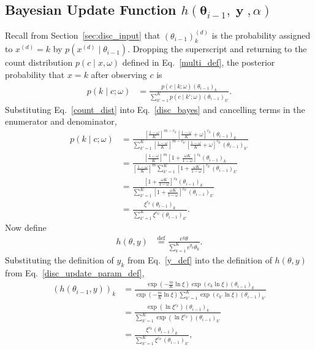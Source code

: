 \documentclass[11pt,table]{article}
\DeclareMathOperator{\y}{\mathbf{y}}
\newcommand*{\defeq}{\stackrel{\text{def}}{=}}
\newcommand{\tidx}[2]{#1_{#2}}
\renewcommand{\vec}[1]{\boldsymbol{#1}}
\newcommand{\pars}{\theta}
\newcommand{\parsn}{\vec{\pars}}
\newcommand{\parsnt}[1]{\tidx{\parsn}{#1}}
\newcommand{\0}[1]{\constvec{0}{#1}}
\newcommand{\1}[1]{\constvec{1}{#1}}
\begin{document}
\subsection{Bayesian Update Function \texorpdfstring{$h(\parsnt{i-1}, \y, \alpha)$}{}}
Recall from Section~\ref{sec:disc_input} that $(\theta_{i-1})^{(d)}_k$ is the probability assigned to $x^{(d)}=k$ by $p(x^{(d)} \mid \theta_{i-1})$.
Dropping the superscript and returning to the count distribution $p(c \mid x, \omega)$ defined in Eq.~\ref{multi_def}, the posterior probability that $x=k$ after observing $c$ is
\begin{align}
p(k \mid c; \omega) &= \frac{p (c \mid k; \omega) (\theta_{i-1})_k}{\sum_{k'=1}^K p(c \mid k';\omega)(\theta_{i-1})_{k'}}.\label{disc_bayes}
\end{align}
Substituting Eq.~\ref{count_dist} into Eq.~\ref{disc_bayes} and cancelling terms in the enumerator and denominator,
\begin{align}
p(k\mid c;\omega) &= \frac{\left[\frac{1-\omega}{K}\right]^{m-c_k}\left[\frac{1-\omega}{K} + \omega\right]^{c_k} (\theta_{i-1})_k}{ \sum_{k'=1}^K{\left[\frac{1-\omega}{K}\right]^{m-c_{k'}}\left[\frac{1-\omega}{K} +\omega \right]^{c_{k'}}(\theta_{i-1})_{k'}}}\\
&=  \frac{\left[\frac{1-\omega}{K}\right]^{m}\left[1 + \frac{\omega K}{1-\omega}\right]^{c_k}(\theta_{i-1})_k}{ \left[\frac{1-\omega}{K}\right]^{m}\sum_{k'=1}^K{\left[1 + \frac{\omega K}{1-\omega}\right]^{c_{k'}}(\theta_{i-1})_{k'}}}\\
&=  \frac{\left[1 + \frac{\omega K}{1-\omega}\right]^{c_k}(\theta_{i-1})_k}{ \sum_{k'=1}^K{\left[1 + \frac{\omega K}{1-\omega}\right]^{c_{k'}}(\theta_{i-1})_{k'}}}\\
&= \frac{\xi^{c_k}(\theta_{i-1})_k}{ \sum_{k'=1}^K{\xi^{c_{k'}}(\theta_{i-1})_{k'}}}\label{post_prob}.
\end{align}
Now define
\begin{align}
h(\theta, y) &\defeq \frac{e^y\theta}{\sum_{k=1}^K e^{y_{k}}\theta_{k}}\label{disc_update_param_def}.
\end{align}
Substituting the definition of $y_k$ from Eq.~\ref{y_def} into the definition of $h(\theta, y)$ from Eq.~\ref{disc_update_param_def},
\begin{align}
\left(h(\theta_{i-1}, y)\right)_k &= \frac{\exp(-\frac{m}{K} \ln \xi)\exp(c_k\ln \xi )(\theta_{i-1})_k}{\exp(-\frac{m}{K} \ln \xi)\sum_{k'=1}^K \exp(c_{k'} \ln \xi )(\theta_{i-1})_{k'}}\\
&= \frac{\exp(\ln \xi^{c_k} )(\theta_{i-1})_k}{\sum_{k'=1}^K \exp(\ln \xi^{c_{k'}})(\theta_{i-1})_{k'}}\\
&= \frac{\xi^{c_k}(\theta_{i-1})_k}{\sum_{k'=1}^K \xi^{c_{k'}}(\theta_{i-1})_{k'}},\\
\end{align}
\end{document}
